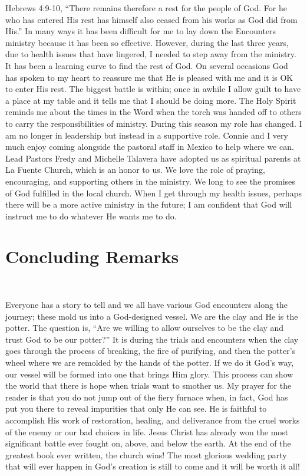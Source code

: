 \documentclass[oneside]{book}
\begin{document}
Hebrews 4:9-10, “There remains therefore a rest for the people of God. For he who has entered His rest has himself also ceased from his works as God did from His.” In many ways it has been difficult for me to lay down the Encounters ministry because it has been so effective. However, during the last three years, due to health issues that have lingered, I needed to step away from the ministry. It has been a learning curve to find the rest of God. On several occasions God has spoken to my heart to reassure me that He is pleased with me and it is OK to enter His rest. The biggest battle is within; once in awhile I allow guilt to have a place at my table and it tells me that I should be doing more. The Holy Spirit reminds me about the times in the Word when the torch was handed off to others to carry the responsibilities of ministry. During this season my role has changed. I am no longer in leadership but instead in a supportive role. Connie and I very much enjoy coming alongside the pastoral staff in Mexico to help where we can. Lead Pastors Fredy and Michelle Talavera have adopted us as spiritual parents at La Fuente Church, which is an honor to us. We love the role of praying, encouraging, and supporting others in the ministry. We long to see the promises of God fulfilled in the local church. When I get through my health issues, perhaps there will be a more active ministry in the future; I am confident that God will instruct me to do whatever He wants me to do.


\section{Concluding Remarks}
\

Everyone has a story to tell and we all have various God encounters along the journey; these mold us into a God-designed vessel. We are the clay and He is the potter. The question is, “Are we willing to allow ourselves to be the clay and trust God to be our potter?” It is during the trials and encounters when the clay goes through the process of breaking, the fire of purifying, and then the potter’s wheel where we are remolded by the hands of the potter. If we do it God’s way, our vessel will be formed into one that brings Him glory. This process can show the world that there is hope when trials want to smother us. My prayer for the reader is that you do not jump out of the fiery furnace when, in fact, God has put you there to reveal impurities that only He can see. He is faithful to accomplish His work of restoration, healing, and deliverance from the cruel works of the enemy or our bad choices in life. Jesus Christ has already won the most significant battle ever fought on, above, and below the earth. At the end of the greatest book ever written, the church wins! The most glorious wedding party that will ever happen in God’s creation is still to come and it will be worth it all! 
\end{document}
